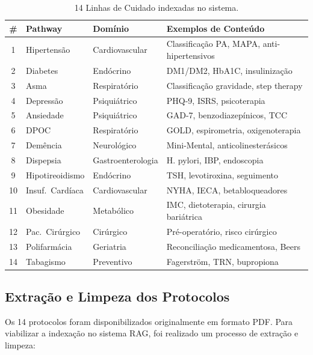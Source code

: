 \begin{table}[H]
\centering
\caption{14 Linhas de Cuidado indexadas no sistema.}
\label{tab:linhas_cuidado}
\begin{tabularx}{\textwidth}{c l l X}
\toprule
\textbf{\#} & \textbf{Pathway} & \textbf{Domínio} & \textbf{Exemplos de Conteúdo} \\
\midrule
1  & Hipertensão          & Cardiovascular    & Classificação PA, MAPA, anti-hipertensivos \\
2  & Diabetes             & Endócrino         & DM1/DM2, HbA1C, insulinização \\
3  & Asma                 & Respiratório      & Classificação gravidade, step therapy \\
4  & Depressão            & Psiquiátrico      & PHQ-9, ISRS, psicoterapia \\
5  & Ansiedade            & Psiquiátrico      & GAD-7, benzodiazepínicos, TCC \\
6  & DPOC                 & Respiratório      & GOLD, espirometria, oxigenoterapia \\
7  & Demência             & Neurológico       & Mini-Mental, anticolinesterásicos \\
8  & Dispepsia            & Gastroenterologia & H. pylori, IBP, endoscopia \\
9  & Hipotireoidismo      & Endócrino         & TSH, levotiroxina, seguimento \\
10 & Insuf.\ Cardíaca     & Cardiovascular    & NYHA, IECA, betabloqueadores \\
11 & Obesidade            & Metabólico        & IMC, dietoterapia, cirurgia bariátrica \\
12 & Pac.\ Cirúrgico      & Cirúrgico         & Pré-operatório, risco cirúrgico \\
13 & Polifarmácia         & Geriatria         & Reconciliação medicamentosa, Beers \\
14 & Tabagismo            & Preventivo        & Fagerström, TRN, bupropiona \\
\bottomrule
\end{tabularx}
\end{table}

\subsection{Extração e Limpeza dos Protocolos}

Os 14 protocolos foram disponibilizados originalmente em formato PDF. Para viabilizar a indexação no sistema RAG, foi realizado um processo de extração e limpeza:

